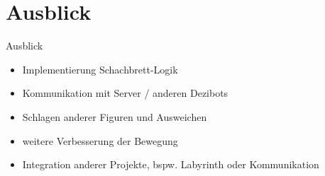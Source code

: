 
\section{Ausblick}

\begin{frame}{Ausblick}
    \begin{itemize}
        \item Implementierung Schachbrett-Logik
        \item Kommunikation mit Server / anderen Dezibots
        \item Schlagen anderer Figuren und Ausweichen
        \item weitere Verbesserung der Bewegung
        \item Integration anderer Projekte, bspw. Labyrinth oder Kommunikation
    \end{itemize}
\end{frame}
